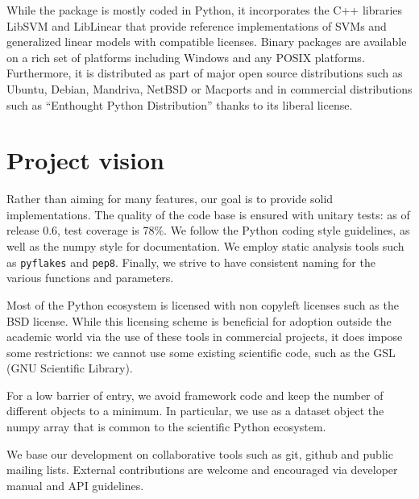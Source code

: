 \documentclass[twoside,11pt]{article}
\begin{document}
While the package is mostly coded in Python, it incorporates the C++
libraries LibSVM \citep{chang2001} and LibLinear \citep{fan2008} that
provide reference implementations of SVMs and generalized linear models
with compatible licenses.
%
Binary packages are available on a rich set of platforms including
Windows and any POSIX platforms. Furthermore, it is distributed as part
of major open source distributions such as Ubuntu, Debian, Mandriva,
NetBSD or Macports and in commercial distributions such as ``Enthought
Python Distribution'' thanks to its liberal license.




\section {Project vision}

%
Rather than aiming for many features, our goal is to provide solid
implementations. The quality of the code base is ensured with unitary
tests: as of release 0.6, test coverage is 78\%. We follow the Python
coding style guidelines, as well as the numpy style for documentation. We
employ static analysis tools such as {\tt pyflakes} and {\tt pep8}.
Finally, we strive to have consistent naming for the various functions
and parameters.

\smallskip {}
%
Most of the Python ecosystem is licensed with non copyleft licenses such
as the BSD license. While this licensing scheme is beneficial for adoption
outside the academic world via the use of these tools in commercial
projects, it does impose some restrictions: we cannot use some existing
scientific code, such as the GSL (GNU Scientific Library).

\smallskip {}
%
For a low barrier of entry, we avoid framework code and keep the number
of different objects to a minimum. In particular, we use as a dataset
object the numpy array \citep{Vanderwalt2011} that is common to the
scientific Python ecosystem.

\smallskip
{}
%
We base our development on collaborative tools such as git, github and
public mailing lists. External contributions are welcome and
encouraged via developer manual and API guidelines.
\end{document}
